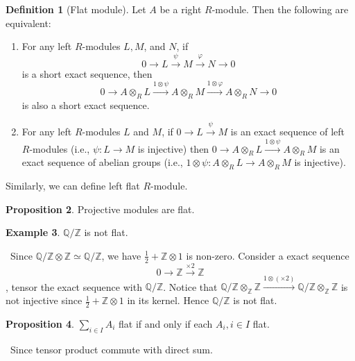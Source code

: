 \documentclass[a4paper,12pt]{article}
\newenvironment{prooff}{{\noindent\it\textcolor{cyan!40!black}{Proof}:}\,}{\par}
\newcommand{\bb}[1]{\mathbb{#1}}
\newcommand{\rarr}[1]{\xrightarrow{#1}}
\theoremstyle{definition}
\newtheorem{defn}{Definition}[subsection]
\newtheorem{prop}[defn]{Proposition}
\newtheorem{exam}[defn]{Example}
\begin{document}
\begin{defn}[Flat module]
    Let $A$ be a right $R$-module. Then the following are equivalent:
    \begin{enumerate}[(1)]
        \item For any left $R$-modules $L, M$, and $N$, if
              $$
                  0 \longrightarrow L \stackrel{\psi}{\longrightarrow} M \stackrel{\varphi}{\longrightarrow} N \longrightarrow 0
              $$
              is a short exact sequence, then
              $$
                  0 \longrightarrow A \otimes_R L \xrightarrow{1 \otimes \psi} A \otimes_R M \stackrel{1 \otimes \varphi}{\longrightarrow} A \otimes_R N \longrightarrow 0
              $$
              is also a short exact sequence.
        \item For any left $R$-modules $L$ and $M$, if $0 \rightarrow L \stackrel{\psi}{\longrightarrow} M$ is an exact sequence of left $R$-modules (i.e., $\psi: L \rightarrow M$ is injective) then $0 \rightarrow A \otimes_R L \xrightarrow{1 \otimes \psi} A \otimes_R M$ is an exact sequence of abelian groups (i.e., $1 \otimes \psi: A \otimes_R L \rightarrow A \otimes_R M$ is injective).
    \end{enumerate}
    Similarly, we can define left flat $R$-module.
\end{defn}
\begin{prop}
    Projective modules are flat.
\end{prop}
\begin{exam}
    $\bb{Q}/\bb{Z}$ is not flat.
    \label{example:Q/Z is not flat.}
\end{exam}
\begin{prooff}
    Since $\bb{Q}/\bb{Z}\otimes \bb{Z}\simeq \bb{Q}/\bb{Z}$, we have $\frac{1}{2}+\bb{Z}\otimes 1$ is non-zero.
    Consider a exact sequence $$0\rightarrow \bb{Z}\rarr{\times 2}\bb{Z}$$, tensor the exact sequence with $\bb{Q}/\bb{Z}$. Notice that $\bb{Q}/\bb{Z}\otimes_{\bb{Z}}\bb{Z}\rarr{1\otimes(\times 2)}\bb{Q}/\bb{Z}\otimes_{\bb{Z}}\bb{Z}$ is not injective since $\frac{1}{2}+\bb{Z}\otimes 1$ in its kernel.
    Hence $\bb{Q}/\bb{Z}$ is not flat.
\end{prooff}
\begin{prop}
    $\sum_{i\in I}A_i$ flat if and only if each $A_i,i\in I$ flat.
    \label{proposition:direct sum preserve flat}
\end{prop}
\begin{prooff}
    Since tensor product commute with direct sum.
\end{prooff}
\end{document}
